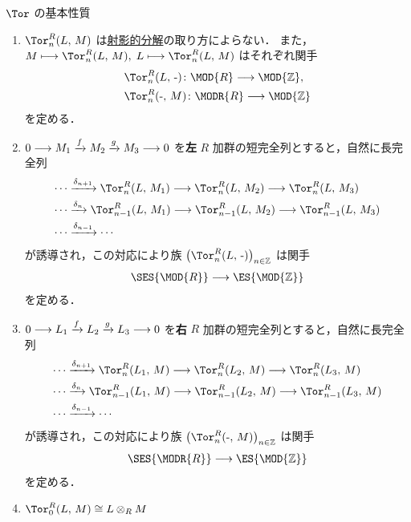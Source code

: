 \documentclass[algtopo_main]{subfiles}
\begin{document}
\begin{myprop}[label=prop:Tor-basic, breakable]{$\Tor$ の基本性質}
    \begin{enumerate}
        \item $\Tor^R_n(L,\, M)$ は\hyperref[def:projective-resolution]{射影的分解}の取り方によらない．
        また，$M \lmto \Tor^R_n(L,\, M),\; L \lmto \Tor^R_n(L,\, M)$ はそれぞれ関手
        \begin{align}
            &\Tor^R_n(L,\, \text{-}) \colon \MOD{R} \lto \MOD{\mathbb{Z}}, \\
            &\Tor^R_n(\text{-},\, M) \colon \MODR{R} \lto \MOD{\mathbb{Z}}
        \end{align}
        を定める．
        \item $0 \longrightarrow M_1 \xrightarrow{f} M_2 \xrightarrow{g} M_3 \longrightarrow 0$ を\textbf{左} $R$ 加群の短完全列とすると，自然に長完全列
        \begin{align}
            \cdots &\xrightarrow{\delta_{n+1}} \Tor^R_n(L,\, M_1) \lto \Tor^R_n(L,\, M_2) \lto \Tor^R_n(L,\, M_3) \\
            \cdots &\xrightarrow{\delta_{n}} \Tor^R_{n-1}(L,\, M_1) \lto \Tor^R_{n-1}(L,\, M_2) \lto \Tor^R_{n-1}(L,\, M_3) \\
            \cdots &\xrightarrow{\delta_{n-1}} \cdots
        \end{align}
        が誘導され，この対応により族 $\bigl( \Tor^R_n(L,\, \text{-}) \bigr)_{n \in \mathbb{Z}}$ は関手
        \begin{align}
            \SES{\MOD{R}} \lto \ES{\MOD{\mathbb{Z}}}
        \end{align}
        を定める．
        \item $0 \longrightarrow L_1 \xrightarrow{f} L_2 \xrightarrow{g} L_3 \longrightarrow 0$ を\textbf{右} $R$ 加群の短完全列とすると，自然に長完全列
        \begin{align}
            \cdots &\xrightarrow{\delta_{n+1}} \Tor^R_n(L_1,\, M) \lto \Tor^R_n(L_2,\, M) \lto \Tor^R_n(L_3,\, M) \\
            \cdots &\xrightarrow{\delta_{n}} \Tor^R_{n-1}(L_1,\, M) \lto \Tor^R_{n-1}(L_2,\, M) \lto \Tor^R_{n-1}(L_3,\, M) \\
            \cdots &\xrightarrow{\delta_{n-1}} \cdots
        \end{align}
        が誘導され，この対応により族 $\bigl( \Tor^R_n(\text{-},\, M) \bigr)_{n \in \mathbb{Z}}$ は関手
        \begin{align}
            \SES{\MODR{R}} \lto \ES{\MOD{\mathbb{Z}}}
        \end{align}
        を定める．
        \item $\Tor^R_0 (L,\, M) \cong L \otimes_R M$
    \end{enumerate}
\end{myprop}
\end{document}
